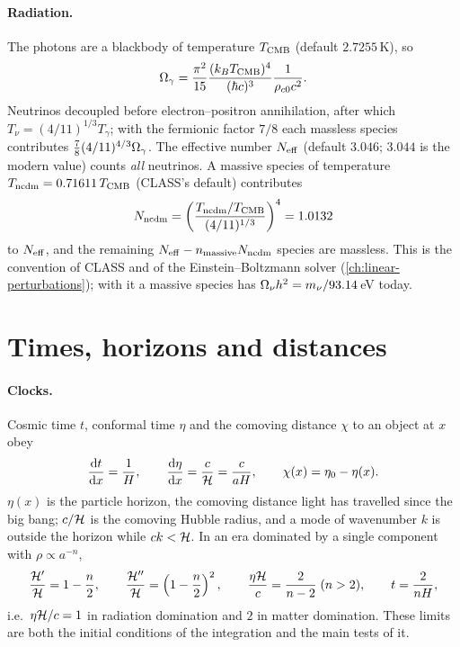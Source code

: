 \paragraph*{Radiation.} The photons are a blackbody of temperature $T_{\rm CMB}$ (default $2.7255$\,K), so
\begin{equation}
\Omega_\gamma=\frac{\pi^2}{15}\frac{(k_BT_{\rm CMB})^4}{(\hbar c)^3}\frac{1}{\rho_{c0}c^2}.
\end{equation}
Neutrinos decoupled before electron--positron annihilation, after which $T_\nu=(4/11)^{1/3}T_\gamma$; with the
fermionic factor $7/8$ each massless species contributes $\frac78(4/11)^{4/3}\Omega_\gamma$. The effective number
$N_{\rm eff}$ (default $3.046$; $3.044$ is the modern value) counts \emph{all} neutrinos. A massive species of
temperature $T_{\rm ncdm}=0.71611\,T_{\rm CMB}$ (CLASS's default) contributes
\begin{equation}
N_{\rm ncdm}=\left(\frac{T_{\rm ncdm}/T_{\rm CMB}}{(4/11)^{1/3}}\right)^4=1.0132
\end{equation}
to $N_{\rm eff}$, and the remaining $N_{\rm eff}-n_{\rm massive}N_{\rm ncdm}$ species are massless. This is the
convention of CLASS and of the Einstein--Boltzmann solver (\cref{ch:linear-perturbations}); with it a massive species
has $\Omega_\nu h^2=m_\nu/93.14\,$eV today.

\section{Times, horizons and distances}\label{sec:bg-distances}

\paragraph*{Clocks.} Cosmic time $t$, conformal time $\eta$ and the comoving distance $\chi$ to an object at $x$
obey
\begin{equation}
\frac{\mathrm{d} t}{\mathrm{d} x}=\frac{1}{H},\qquad \frac{\mathrm{d}\eta}{\mathrm{d} x}=\frac{c}{\mathcal{H}}=\frac{c}{aH},\qquad \chi(x)=\eta_0-\eta(x).
\label{eq:bg-clocks}
\end{equation}
$\eta(x)$ is the particle horizon, the comoving distance light has travelled since the big bang; $c/\mathcal{H}$ is the
comoving Hubble radius, and a mode of wavenumber $k$ is outside the horizon while $ck<\mathcal{H}$. In an era dominated by a
single component with $\rho\propto a^{-n}$,
\begin{equation}
\frac{\mathcal{H}'}{\mathcal{H}}=1-\frac n2,\qquad \frac{\mathcal{H}''}{\mathcal{H}}=\left(1-\frac n2\right)^2,\qquad
\frac{\eta\mathcal{H}}{c}=\frac{2}{n-2}\;(n>2),\qquad t=\frac{2}{nH},
\label{eq:bg-single}
\end{equation}
i.e.\ $\eta\mathcal{H}/c=1$ in radiation domination and $2$ in matter domination. These limits are both the initial
conditions of the integration and the main tests of it.

